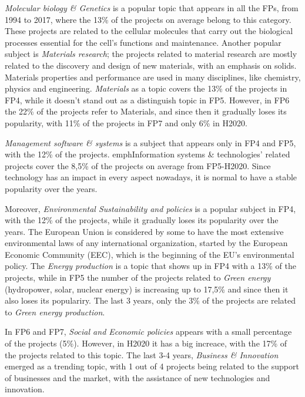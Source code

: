 \documentclass[12pt]{report}
\begin{document}
\emph{Molecular biology \& Genetics} is a popular topic that appears in all the
FPs, from 1994 to 2017, where the 13\% of the projects on average belong to this
category. These projects are related to the cellular molecules that carry out
the biological processes essential for the cell's functions and maintenance.
Another popular subject is \emph{Materials research}; the projects related to
material research are mostly related to the discovery and design of new
materials, with an emphasis on solids. Materials properties and performance are
used in many disciplines, like chemistry, physics and engineering.
\emph{Materials} as a topic covers the 13\% of the projects in FP4, while it
doesn't stand out as a distinguish topic in FP5. However, in FP6 the 22\% of the
projects refer to Materials, and since then it gradually loses its popularity,
with 11\% of the projects in FP7 and only 6\% in H2020.

\emph{Management software \& systems} is a subject that appears only in FP4 and
FP5, with the 12\% of the projects. emph{Information systems \& technologies'}
related projects cover the 8,5\% of the projects on average from FP5-H2020.
Since technology has an impact in every aspect nowadays, it is normal to have a
stable popularity over the years.

Moreover, \emph{Environmental Sustainability and policies} is a popular subject
in FP4, with the 12\% of the projects, while it gradually loses its popularity
over the years. The European Union is considered by some to have the most
extensive environmental laws of any international organization, started by the
European Economic Community (EEC), which is the beginning of the EU's
environmental policy. The \emph{Energy production} is a topic that shows up in
FP4 with a 13\% of the projects, while in FP5 the number of the projects related
to \emph{Green energy} (hydropower, solar, nuclear energy) is increasing up to
17,5\% and since then it also loses its populariry. The last 3 years, only the
3\% of the projects are related to \emph{Green energy production}.

In FP6 and FP7, \emph{Social and Economic policies} appears with a small
percentage of the projects (5\%). However, in H2020 it has a big increace, with
the 17\% of the projects related to this topic. The last 3-4 years,
\emph{Business \& Innovation} emerged as a trending topic, with 1 out of 4
projects being related to the support of businesses and the market, with the
assistance of new technologies and innovation.
\end{document}
